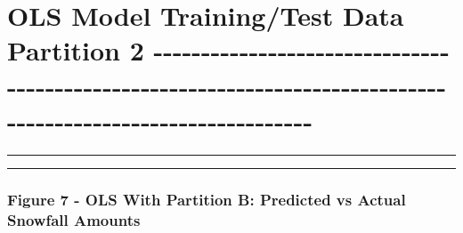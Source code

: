 \documentclass[11pt]{article}
\begin{document}
\section{OLS Model Training/Test Data Partition 2
-\/-\/-\/-\/-\/-\/-\/-\/-\/-\/-\/-\/-\/-\/-\/-\/-\/-\/-\/-\/-\/-\/-\/-\/-\/-\/-\/-\/-\/-\/-\/-\/-\/-\/-\/-\/-\/-\/-\/-\/-\/-\/-\/-\/-\/-\/-\/-\/-\/-\/-\/-\/-\/-\/-\/-\/-\/-\/-\/-\/-\/-\/-\/-\/-\/-\/-\/-\/-\/-\/-\/-\/-\/-\/-\/-\/-\/-\/-\/-\/-\/-\/-\/-\/-\/-\/-\/-\/-\/-\/-\/-\/-\/-\/-\/-\/-\/-\/-\/-\/-\/-\/-\/-\/-\/-\/-\/-\/-}\label{ols-model-trainingtest-data-partition-2--------------------------------------------------------------------------------------------------------------}

\begin{center}\rule{0.5\linewidth}{\linethickness}\end{center}

\begin{center}\rule{0.5\linewidth}{\linethickness}\end{center}

\subsubsection{Figure 7 - OLS With Partition B: Predicted vs Actual
Snowfall
Amounts}\label{figure-7---ols-with-partition-b-predicted-vs-actual-snowfall-amounts}
\end{document}
